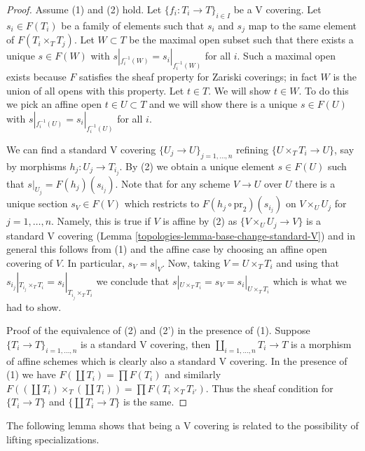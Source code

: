 \begin{proof}

Assume (1) and (2) hold.
Let $\{f_i : T_i \to T\}_{i \in I}$ be a V covering. Let $s_i \in F(T_i)$
be a family of elements such that $s_i$ and $s_j$ map to the same element
of $F(T_i \times_T T_j)$. Let $W \subset T$ be the maximal open subset
such that there exists a unique $s \in F(W)$ with
$s|_{f_i^{-1}(W)} = s_i|_{f_i^{-1}(W)}$ for all $i$.
Such a maximal open exists because $F$ satisfies the
sheaf property for Zariski coverings; in fact $W$ is the
union of all opens with this property. Let $t \in T$.
We will show $t \in W$. To do this we pick an affine open
$t \in U \subset T$ and we will show there is a unique
$s \in F(U)$ with
$s|_{f_i^{-1}(U)} = s_i|_{f_i^{-1}(U)}$ for all $i$.

\medskip\noindent
We can find a standard V covering
$\{U_j \to U\}_{j = 1, \ldots, n}$ refining $\{U \times_T T_i \to U\}$,
say by morphisms $h_j : U_j \to T_{i_j}$. By (2) we obtain a unique element
$s \in F(U)$ such that $s|_{U_j} = F(h_j)(s_{i_j})$. Note that for any
scheme $V \to U$ over $U$ there is a unique section $s_V \in F(V)$
which restricts to $F(h_j \circ \text{pr}_2)(s_{i_j})$ on
$V \times_U U_j$ for $j = 1, \ldots, n$. Namely, this is true if $V$
is affine by (2) as $\{V \times_U U_j \to V\}$ is a standard V covering
(Lemma \ref{topologies-lemma-base-change-standard-V})
and in general this follows from (1) and the affine case by choosing an
affine open covering of $V$. In particular, $s_V = s|_V$.
Now, taking $V = U \times_T T_i$ and using that
$s_{i_j}|_{T_{i_j} \times_T T_i} = s_i|_{T_{i_j} \times_T T_i}$
we conclude that $s|_{U \times_T T_i} = s_V = s_i|_{U \times_T T_i}$
which is what we had to show.

\medskip\noindent
Proof of the equivalence of (2) and (2') in the presence of (1).
Suppose $\{T_i \to T\}_{i = 1, \ldots, n}$ is a standard V covering, then
$\coprod_{i = 1, \ldots, n} T_i \to T$ is a morphism of affine schemes
which is clearly also a standard V covering.
In the presence of (1) we have $F(\coprod T_i) = \prod F(T_i)$
and similarly
$F((\coprod T_i) \times_T (\coprod T_i)) = \prod F(T_i \times_T T_{i'})$.
Thus the sheaf condition for $\{T_i \to T\}$ and $\{\coprod T_i \to T\}$
is the same.
\end{proof}

The following lemma shows that being a V covering is
related to the possibility of lifting specializations.

